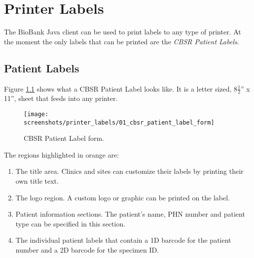 \chapter{Printer Labels}
\label{chap:printer_labels}

The BioBank Java client can be used to print labels to any type of printer. At
the moment the only labels that can be printed are the \emph{CBSR Patient
  Labels}.

\section{Patient Labels}
\label{sec:printer_labels}

Figure \ref{fig:cbsr_patient_label} shows what a CBSR Patient Label looks
like. It is a letter sized, 8$\frac{1}{2}$'' x 11'', sheet that feeds into any
printer.

    \begin{figure}[H]
      \centering
      \scalebox{0.35}
      { \texttt{[image: screenshots/printer\_labels/01\_cbsr\_patient\_label\_form]} }
      \caption{CBSR Patient Label form.}
      \label{fig:cbsr_patient_label}
    \end{figure}

The regions highlighted in orange are:
\begin{enumerate}
  \item The title area. Clinics and sites can customize their labels by
    printing their own title text.
  \item The logo region. A custom logo or graphic can be printed on the label.
  \item Patient information sections. The patient's name, PHN number and
    patient type can be specified in this section.
  \item The individual patient labels that contain a 1D barcode for the patient
    number and a 2D barcode for the specimen ID.
\end{enumerate}
